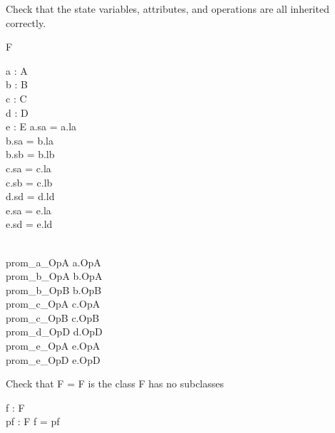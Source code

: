 Check that the state variables, attributes, and operations are all
inherited correctly.
\begin{class}{F}
  \begin{state}
    a : \poly A\\
    b : \poly B\\
    c : \poly C\\
    d : \poly D\\
    e : E
  \where
    a.sa = a.la\\
    b.sa = b.la\\
    b.sb = b.lb\\
    c.sa = c.la\\
    c.sb = c.lb\\
    d.sd = d.ld\\
    e.sa = e.la\\
    e.sd = e.ld
  \end{state}\\
  prom\_a\_OpA \sdef a.OpA\\
  prom\_b\_OpA \sdef b.OpA\\
  prom\_b\_OpB \sdef b.OpB\\
  prom\_c\_OpA \sdef c.OpA\\
  prom\_c\_OpB \sdef c.OpB\\
  prom\_d\_OpD \sdef d.OpD\\
  prom\_e\_OpA \sdef e.OpA\\
  prom\_e\_OpD \sdef e.OpD
\end{class}

Check that F = \poly F is the class F has no subclasses
\begin{axdef}
  f : F\\
  pf : \poly F
\where
  f = pf
\end{axdef}

